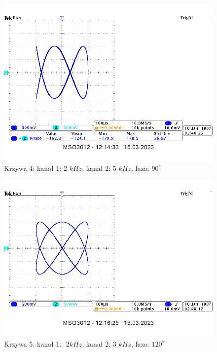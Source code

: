 \documentclass[14pt, table]{extarticle}
\begin{document}
\begin{figure}[H]
\includegraphics[scale=0.55]{A7}
\centering
\captionsetup{labelformat=empty}
\caption{Krzywa 4: kanał 1: $ 2$ $kHz$, kanał 2: $ 5$ $kHz$, faza: $90^{\circ}$}
\end{figure}

\begin{figure}[H]
\includegraphics[scale=0.55]{A8}
\centering
\captionsetup{labelformat=empty}
\caption{Krzywa 5: kanał 1: $ $ 2$kHz$, kanał 2: $ 3$ $kHz$, faza: $120^{\circ}$}
\end{figure}
\end{document}
